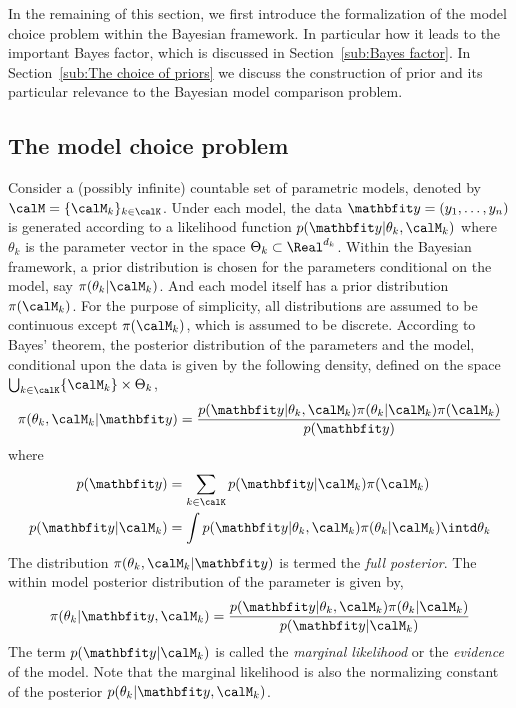 In the remaining of this section, we first introduce the formalization of the
model choice problem within the Bayesian framework. In particular how it leads
to the important Bayes factor, which is discussed in Section~\ref{sub:Bayes
  factor}. In Section~\ref{sub:The choice of priors} we discuss the
construction of prior and its particular relevance to the Bayesian model
comparison problem.

\subsection{The model choice problem}
\label{sub:The model choice problem}

Consider a (possibly infinite) countable set of parametric models, denoted by
$\calM = \{\calM_k\}_{k\in\calK}$. Under each model, the data $\data =
(y_1,\dots,y_n)$ is generated according to a likelihood function
$p(\data|\theta_k,\calM_k)$ where $\theta_k$ is the parameter vector in the
space $\Theta_k\subset\Real^{d_k}$. Within the Bayesian framework, a prior
distribution is chosen for the parameters conditional on the model, say
$\pi(\theta_k|\calM_k)$. And each model itself has a prior distribution
$\pi(\calM_k)$. For the purpose of simplicity, all distributions are assumed
to be continuous except $\pi(\calM_k)$, which is assumed to be discrete.
According to Bayes' theorem, the posterior distribution of the parameters and
the model, conditional upon the data is given by the following density,
defined on the space $\bigcup_{k\in\calK}\{\calM_k\}\times\Theta_k$,
\begin{equation}
  \pi(\theta_k,\calM_k|\data) =
  \frac{p(\data|\theta_k,\calM_k)\pi(\theta_k|\calM_k)\pi(\calM_k)}{p(\data)}
  \label{eq:full posterior}
\end{equation}
where
\begin{align}
  p(\data) &= \sum_{k\in\calK}p(\data|\calM_k)\pi(\calM_k) \\
  p(\data|\calM_k) &=
  \int p(\data|\theta_k,\calM_k)\pi(\theta_k|\calM_k)\intd\theta_k
  \label{eq:marginal likelihood}
\end{align}
The distribution $\pi(\theta_k,\calM_k|\data)$ is termed the \emph{full
  posterior}. The within model posterior distribution of the parameter is
given by,
\begin{equation}
  \pi(\theta_k|\data,\calM_k) =
  \frac{p(\data|\theta_k,\calM_k)\pi(\theta_k|\calM_k)}{p(\data|\calM_k)}
  \label{eq:within posterior}
\end{equation}
The term $p(\data|\calM_k)$ is called the \emph{marginal likelihood} or the
\emph{evidence} of the model. Note that the marginal likelihood is also the
normalizing constant of the posterior $p(\theta_k|\data,\calM_k)$.

